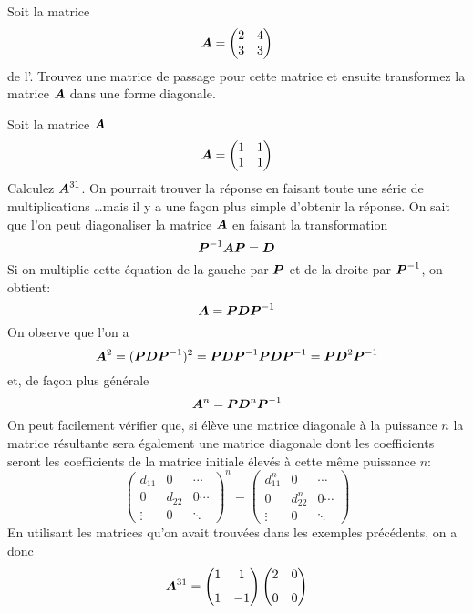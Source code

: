 \begin{exerciceC}
Soit la matrice \[
\boldsymbol{A} = \begin{pmatrix}
2 & 4 \\ 3 & 3
\end{pmatrix}
\]
de l'.
Trouvez une matrice de passage pour cette matrice et ensuite transformez la matrice $\boldsymbol{A}$
dans une forme diagonale.
\end{exerciceC}

\begin{exemple}
Soit la matrice $\boldsymbol{A}$ 
\[
 \boldsymbol{A} = \begin{pmatrix}
1 & 1 \\ 1 & 1
\end{pmatrix}
\]
Calculez $\boldsymbol{A}^{31}$.
\solution
On pourrait trouver la réponse en faisant toute une série de multiplications \ldots mais
il y a une façon plus simple d'obtenir la réponse.  On sait que l'on peut diagonaliser
la matrice $\boldsymbol{A}$ en faisant la transformation
\[
\boldsymbol{P}^{-1}\boldsymbol{A}\boldsymbol{P} = \boldsymbol{D}
\]
Si on multiplie cette équation de la gauche par $\boldsymbol{P}$ et de la droite par $\boldsymbol{P}^{-1}$,
on obtient:
\[
\boldsymbol{A} = \boldsymbol{P}\boldsymbol{D}\boldsymbol{P}^{-1}
\]
On observe que l'on a
\[
\boldsymbol{A}^2 = (\boldsymbol{P}\boldsymbol{D}\boldsymbol{P}^{-1})^2 = \boldsymbol{P}\boldsymbol{D}\boldsymbol{P}^{-1}\boldsymbol{P}\boldsymbol{D}\boldsymbol{P}^{-1} = \boldsymbol{P}\boldsymbol{D}^2\boldsymbol{P}^{-1}
\]
et, de façon plus générale
\[
\boldsymbol{A}^n = \boldsymbol{P}\boldsymbol{D}^n\boldsymbol{P}^{-1}
\]
On peut facilement vérifier que, si élève une matrice diagonale à la puissance $n$ la matrice
résultante sera également une matrice diagonale dont les coefficients seront les coefficients
de la matrice initiale élevés à cette même puissance $n$:
\[
\left(\begin{matrix}
d_{11} & 0 & \cdots \\
0 & d_{22} & 0\cdots \\
\vdots & 0 & \ddots
\end{matrix}\right)^n
=
\begin{pmatrix}
d_{11}^n & 0 & \cdots \\
0 & d_{22}^n & 0\cdots \\
\vdots & 0 & \ddots
\end{pmatrix}
\]
En utilisant les matrices qu'on avait trouvées dans les exemples précédents, on a donc
\begin{eqnarray*}
\boldsymbol{A}^{31} = \begin{pmatrix}
1 & 1 \\[7pt] 1 & -1
\end{pmatrix}
\begin{pmatrix}
2 & 0 \\[7pt] 0 & 0

\end{pmatrix}
\end{eqnarray*}
\end{exemple}
